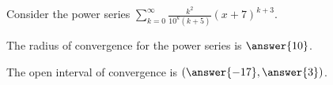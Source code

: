 \documentclass{ximera}
\author{Jim Talamo}
\begin{document}
\begin{exercise}
Consider the power series $\sum_{k=0}^{\infty} \frac{k^2 }{10^k (k+5)}(x+7)^{k+3}$.

The radius of convergence for the power series is $\answer{10}$.

The open interval of convergence is $\left(\answer{-17}, \answer{3}\right)$.


\end{exercise}
\end{document}
